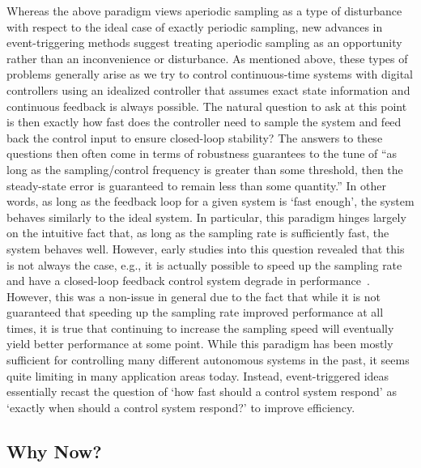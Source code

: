 \documentclass{autart}
\begin{document}
Whereas the above paradigm views aperiodic sampling as a type of
disturbance with respect to the ideal case of exactly periodic
sampling, new advances in event-triggering methods suggest treating
aperiodic sampling as an opportunity rather than an inconvenience or
disturbance. As mentioned above, these types of problems generally
arise as we try to control continuous-time systems with digital
controllers using an idealized controller that assumes exact state
information and continuous feedback is always possible. The natural
question to ask at this point is then exactly how fast does the
controller need to sample the system and feed back the control input
to ensure closed-loop stability? The answers to these questions then
often come in terms of robustness guarantees to the tune of ``as long
as the sampling/control frequency is greater than some threshold, then
the steady-state error is guaranteed to remain less than some
quantity.'' In other words, as long as the feedback loop for a given
system is `fast enough', the system behaves similarly to the ideal
system. In particular, this paradigm hinges largely on the intuitive
fact that, as long as the sampling rate is sufficiently fast, the
system behaves well. However, early studies into this question
revealed that this is not always the case, e.g., it is actually
possible to speed up the sampling rate and have a closed-loop feedback
control system degrade in
performance~\citep{SG:63,GB-RT:66,AL-JW:66,RT-GB:66,JM-WM:67,DC-LM:67}. However,
this was a non-issue in general due to the fact that while it is not
guaranteed that speeding up the sampling rate improved performance at
all times, it is true that continuing to increase the sampling speed
will eventually yield better performance at some point. While this
paradigm has been mostly sufficient for controlling many different
autonomous systems in the past, it seems quite limiting in many
application areas today. Instead, event-triggered ideas essentially
recast the question of `how fast should a control system respond' as
`exactly when should a control system respond?' to improve efficiency.

\subsection*{Why Now?}
\end{document}
